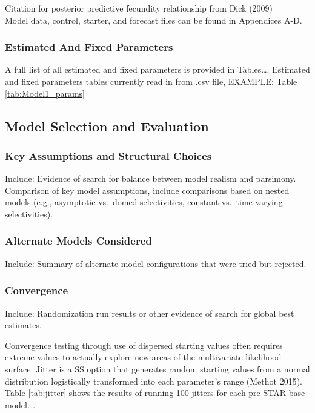 \documentclass[12pt,]{article}
\begin{document}
Citation for posterior predictive fecundity relationship from Dick
(2009)\\
Model data, control, starter, and forecast files can be found in
Appendices A-D.

\subsubsection{Estimated And Fixed
Parameters}\label{estimated-and-fixed-parameters}

A full list of all estimated and fixed parameters is provided in
Tables\ldots{}. Estimated and fixed parameters tables currently read in
from .csv file, EXAMPLE: Table \ref{tab:Model1_params}

\subsection{Model Selection and
Evaluation}\label{model-selection-and-evaluation}

\subsubsection{Key Assumptions and Structural
Choices}\label{key-assumptions-and-structural-choices}

Include: Evidence of search for balance between model realism and
parsimony.\\
Comparison of key model assumptions, include comparisons based on nested
models (e.g., asymptotic vs.~domed selectivities, constant
vs.~time-varying selectivities).

\subsubsection{Alternate Models
Considered}\label{alternate-models-considered}

Include: Summary of alternate model configurations that were tried but
rejected.

\subsubsection{Convergence}\label{convergence}

Include: Randomization run results or other evidence of search for
global best estimates.

Convergence testing through use of dispersed starting values often
requires extreme values to actually explore new areas of the
multivariate likelihood surface. Jitter is a SS option that generates
random starting values from a normal distribution logistically
transformed into each parameter's range (Methot 2015). Table
\ref{tab:jitter} shows the results of running 100 jitters for each
pre-STAR base model\ldots{}.
\end{document}
